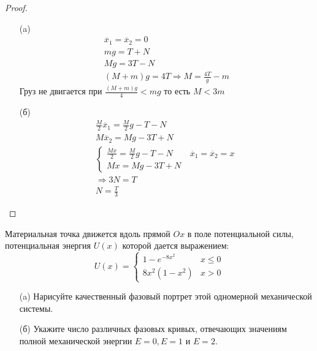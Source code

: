 \begin{proof}
\begin{itemize}
\item[]
\item[(a)]
    \begin{gather*}
        \ddot{x_1} = \ddot{x_2} = 0\\
        mg = T + N\\
        Mg = 3T - N\\
        \left(M + m\right)g = 4T\Rightarrow
        M = \frac{4T}{g} - m
    \end{gather*}
    Груз не двигается при $\frac{\left(M + m\right)g}{4} < mg$ то есть $M < 3m$
\item[(б)]
    \begin{gather*}
        \frac{M}{2} \ddot{x_1} = \frac{M}{2}g - T - N\\
        M \ddot{x_2} = Mg - 3T + N\\
        \begin{cases}
            \frac{Mx}{2} = \frac{M}{2} g - T - N \qquad \ddot{x_1} = \ddot{x_2} = x\\
            Mx = Mg - 3T + N
        \end{cases}\\
        \Rightarrow
        3N = T\\
        N = \frac{T}{3}
    \end{gather*}
\end{itemize}
\end{proof}
\vskip 0.6in




\begin{prob}
Материальная точка движется вдоль прямой $O x$ в поле потенциальной силы, потенциальная энергия $U(x)$ которой дается выражением:
$$
U(x) =
\begin{cases}
    1-e^{-8 x^2} & x \leq 0 \\
    8 x^2\left(1-x^2\right) & x>0
\end{cases}
$$
\begin{itemize}
\item[]
\item[(a)] Нарисуйте качественный фазовый портрет этой одномерной механической системы.
\item[(б)] Укажите число различных фазовых кривых, отвечающих значениям полной механической энергии $E=0, E=1$ и $E=2$.
\end{itemize}
\end{prob}

